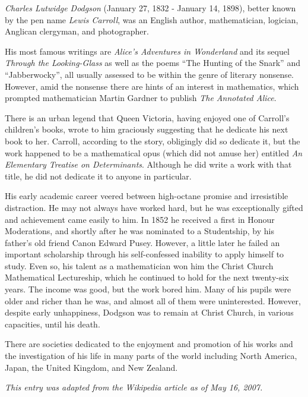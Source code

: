 \documentclass[12pt]{article}
\begin{document}
{\em Charles Lutwidge Dodgson} (January 27, 1832 - January 14, 1898), better known by the pen name {\em Lewis Carroll}, was an English author, mathematician, logician, Anglican clergyman, and photographer.

His most famous writings are {\it Alice's Adventures in Wonderland} and its sequel {\it Through the Looking-Glass} as well as the poems ``The Hunting of the Snark'' and ``Jabberwocky'', all usually assessed to be within the genre of literary nonsense. However, amid the nonsense there are hints of an interest in mathematics, which prompted mathematician Martin Gardner to publish {\it The Annotated Alice}.

There is an urban legend that Queen Victoria, having enjoyed one of Carroll's children's books, wrote to him graciously suggesting that he dedicate his next book to her. Carroll, according to the story, obligingly did so dedicate it, but the work happened to be a mathematical opus (which did not amuse her) entitled {\it An Elementary Treatise on Determinants}. Although he did write a work with that title, he did not dedicate it to anyone in particular.

His early academic career veered between high-octane promise and irresistible distraction. He may not always have worked hard, but he was exceptionally gifted and achievement came easily to him. In 1852 he received a first in Honour Moderations, and shortly after he was nominated to a Studentship, by his father's old friend Canon Edward Pusey. However, a little later he failed an important scholarship through his self-confessed inability to apply himself to study. Even so, his talent as a mathematician won him the Christ Church Mathematical Lectureship, which he continued to hold for the next twenty-six years. The income was good, but the work bored him. Many of his pupils were older and richer than he was, and almost all of them were uninterested. However, despite early unhappiness, Dodgson was to remain at Christ Church, in various capacities, until his death.

There are societies dedicated to the enjoyment and promotion of his works and the investigation of his life in many parts of the world including North America, Japan, the United Kingdom, and New Zealand.

{\it This entry was adapted from the Wikipedia article  as of May 16, 2007.}
\end{document}
